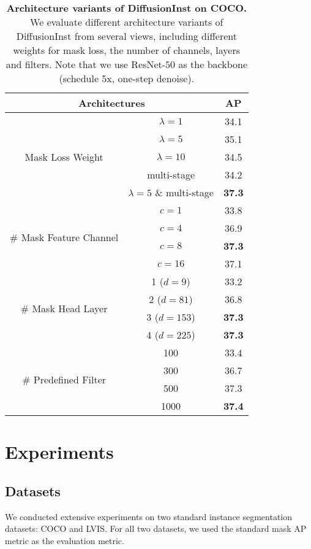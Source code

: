 \documentclass{article}
\begin{document}
\begin{table}[thb]
\centering
\begin{tabular}{c|c|c}
\toprule
\multicolumn{2}{c|}{Architectures}           & AP  \\ \hline
\multirow{5}{*}{Mask Loss Weight}  & $\lambda = 1$    &   34.1   \\
& $\lambda = 5$  & 35.1 \\ 
& $\lambda = 10$  &  34.5\\ 
& multi-stage & 34.2 \\ 
& $\lambda = 5$ \& multi-stage & \textbf{37.3} \\ \hline
\multirow{4}{*}{\# Mask Feature Channel}  & $c=1$    &  33.8    \\
& $c=4$ & 36.9 \\ 
& $c=8$ & \textbf{37.3} \\ 
& $c=16$ & 37.1 \\ \hline
\multirow{4}{*}{\# Mask Head Layer}  & 1 ($d=9$) &  33.2 \\
& 2 ($d=81$)  &     36.8   \\
& 3 ($d=153$)  &     \textbf{37.3}   \\
& 4 ($d=225$)  &     \textbf{37.3}  \\ \hline
\multirow{4}{*}{\# Predefined Filter}  & 100 & 33.4  \\
& 300  &   36.7     \\
& 500  &    37.3  \\
& 1000  &    \textbf{37.4}    \\
\bottomrule
\end{tabular}
\caption{\textbf{Architecture variants of DiffusionInst on COCO.} We evaluate different architecture variants of DiffusionInst from several views, including different weights for mask loss, the number of channels, layers and filters. Note that we use ResNet-$50$ as the backbone (schedule 5x, one-step denoise).}
\label{tab:ablation}
\end{table}




\section{Experiments}

\subsection{Datasets}

We conducted extensive experiments on two standard
instance segmentation datasets: COCO\cite{COCO} and LVIS\cite{LVIS}. For all two datasets, we used the standard mask AP metric\cite{COCO} as the evaluation metric.
\end{document}
